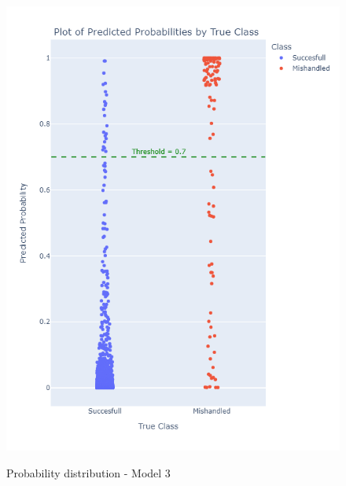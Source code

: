 \documentclass[12pt]{article}
\begin{document}
\begin{figure}
\begin{minipage}[c]{0.4\linewidth}
    \includegraphics[width=1\textwidth]{Probability_distribution_Model 3.png}\\
    \caption{Probability distribution - Model 3}
\end{minipage}
\hfill
\begin{minipage}[c]{0.4\linewidth}

\end{minipage}
\end{figure}
\end{document}
